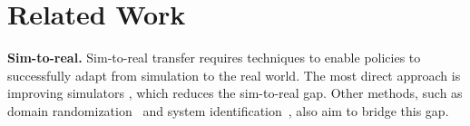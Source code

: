 



\section{Related Work}
\noindent\textbf{Sim-to-real.}
Sim-to-real transfer requires techniques to enable policies to successfully adapt from simulation to the real world. The most direct approach is improving simulators \citep{todorov2012mujoco, makoviychuk2021isaac, mittal2023orbit, Xiang_2020_SAPIEN}, which reduces the sim-to-real gap. Other methods, such as domain randomization~\citep{tobin2017domain, mehta2020active, chen2021understanding, tremblay2018training, loquercio2019deep, tobin2018domain} and system identification~\citep{ramaswamy2024adaptation, allevato2020iterative, song2024systemid, pmlr-v100-allevato20a}, also aim to bridge this gap.

